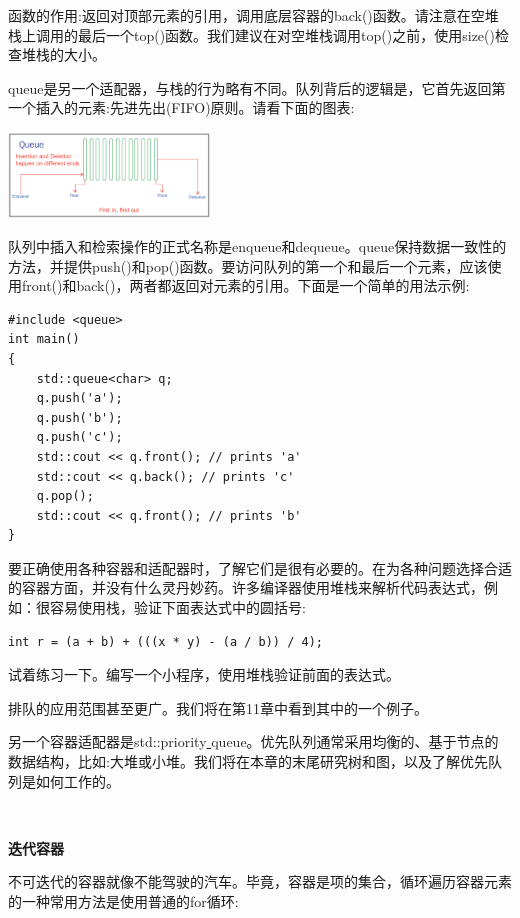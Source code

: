 函数的作用:返回对顶部元素的引用，调用底层容器的back()函数。请注意在空堆栈上调用的最后一个top()函数。我们建议在对空堆栈调用top()之前，使用size()检查堆栈的大小。 \par
queue是另一个适配器，与栈的行为略有不同。队列背后的逻辑是，它首先返回第一个插入的元素:先进先出(FIFO)原则。请看下面的图表: \par

\begin{center}
	\includegraphics[width=0.4\textwidth]{content/Section-2/Chapter-6/17}
\end{center}

队列中插入和检索操作的正式名称是enqueue和dequeue。queue保持数据一致性的方法，并提供push()和pop()函数。要访问队列的第一个和最后一个元素，应该使用front()和back()，两者都返回对元素的引用。下面是一个简单的用法示例: \par

\begin{lstlisting}[caption={}]
#include <queue>
int main()
{
	std::queue<char> q;
	q.push('a');
	q.push('b');
	q.push('c');
	std::cout << q.front(); // prints 'a'
	std::cout << q.back(); // prints 'c'
	q.pop();
	std::cout << q.front(); // prints 'b'
}
\end{lstlisting}

要正确使用各种容器和适配器时，了解它们是很有必要的。在为各种问题选择合适的容器方面，并没有什么灵丹妙药。许多编译器使用堆栈来解析代码表达式，例如：很容易使用栈，验证下面表达式中的圆括号: \par

\begin{lstlisting}[caption={}]
int r = (a + b) + (((x * y) - (a / b)) / 4);
\end{lstlisting}

试着练习一下。编写一个小程序，使用堆栈验证前面的表达式。 \par
排队的应用范围甚至更广。我们将在第11章中看到其中的一个例子。 \par
另一个容器适配器是std::priority\underline{ }queue。优先队列通常采用均衡的、基于节点的数据结构，比如:大堆或小堆。我们将在本章的末尾研究树和图，以及了解优先队列是如何工作的。 \par

\noindent\textbf{}\ \par
\textbf{迭代容器} \ \par
不可迭代的容器就像不能驾驶的汽车。毕竟，容器是项的集合，循环遍历容器元素的一种常用方法是使用普通的for循环: \par

